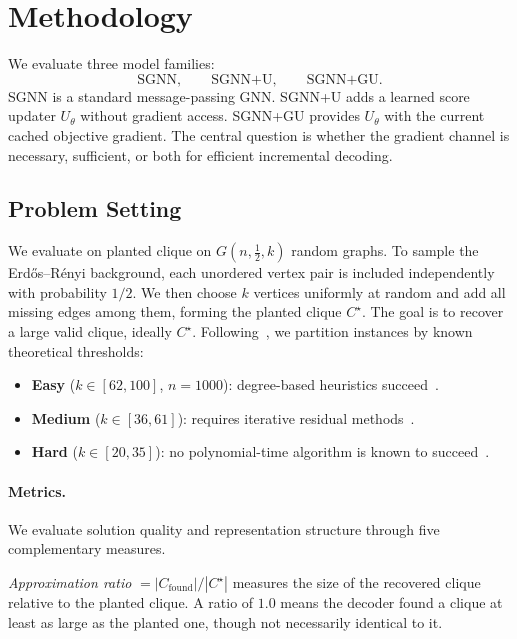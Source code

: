 \documentclass[11pt]{article}
\theoremstyle{plain}
\theoremstyle{remark}
\begin{document}
\section{Methodology}
\label{sec:method}

We evaluate three model families:
\[
  \text{SGNN},\qquad
  \text{SGNN+U},\qquad
  \text{SGNN+GU}.
\]
SGNN is a standard message-passing GNN. SGNN+U adds a learned score updater
$U_\theta$ without gradient access. SGNN+GU provides $U_\theta$ with the current
cached objective gradient. The central question is whether the gradient channel is
necessary, sufficient, or both for efficient incremental decoding.

\subsection{Problem Setting}
\label{sec:problem}

We evaluate on planted clique on $G(n,\tfrac{1}{2},k)$ random graphs. To sample
the Erd\H{o}s--R\'enyi background, each unordered vertex pair is included
independently with probability $1/2$. We then choose $k$ vertices uniformly at random
and add all missing edges among them, forming the planted clique $C^\star$. The goal
is to recover a large valid clique, ideally $C^\star$. Following~\citet{shoham2026ltr},
we partition instances by known theoretical thresholds:
\begin{itemize}
  \item \textbf{Easy} ($k\in[62,100]$, $n=1000$): degree-based heuristics
    succeed~\citep{kucera1995}.
  \item \textbf{Medium} ($k\in[36,61]$): requires iterative residual
    methods~\citep{alon1998, feige2010}.
  \item \textbf{Hard} ($k\in[20,35]$): no polynomial-time algorithm is known to
    succeed~\citep{manurangsi2021}.
\end{itemize}

\paragraph{Metrics.}
We evaluate solution quality and representation structure through five complementary
measures.

\textit{Approximation ratio} $= |C_{\text{found}}|/|C^\star|$ measures the size of
the recovered clique relative to the planted clique. A ratio of $1.0$ means the
decoder found a clique at least as large as the planted one, though not necessarily
identical to it.
\end{document}
